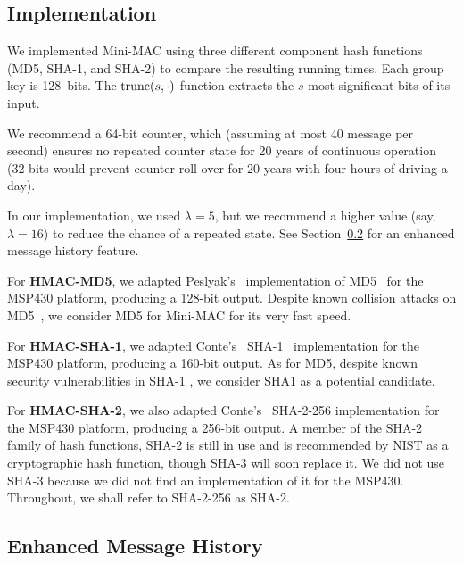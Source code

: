 \subsection{Implementation}
\label{implementation}

We implemented Mini-MAC using three different component hash functions (MD5, SHA-1, and SHA-2) to compare the resulting running times.  
Each group key is 128~bits.  The $\hbox{trunc}(s,\cdot)$ function extracts 
the $s$ most significant bits of its input.

We recommend a 64-bit counter, which (assuming at most 40 message per second) ensures no repeated counter state for 20 years
of continuous operation (32 bits would prevent counter roll-over for 20 years with four hours of driving a day).

In our implementation, we used $\lambda = 5$, 
but we recommend a higher value (say, $\lambda = 16$) to reduce the chance of a repeated state.
See Section~\ref{history} for an enhanced message history feature.

For \textbf{HMAC-MD5},
we adapted Peslyak's~\cite{Peslyak} implementation of MD5~\cite{MD5} for the MSP430 platform, producing a 128-bit output. 
Despite known collision attacks on MD5~\cite{Wang-MD5}, we consider
MD5 for Mini-MAC for its very fast speed.  

For \textbf{HMAC-SHA-1},
we adapted Conte's~\cite{Conte-SHA1} SHA-1~\cite{FIPS-180-4} implementation for the MSP430 platform, producing a 160-bit output. 
As for MD5, despite known security vulnerabilities in SHA-1 \cite{Wang-SHA1}, 
we consider SHA1 as a potential candidate.


For \textbf{HMAC-SHA-2},
we also adapted Conte's~\cite{Conte-SHA256} SHA-2-256 implementation for the MSP430 platform, producing a 256-bit output. 
A member of the SHA-2 family of hash functions, SHA-2 is still in use and is recommended by NIST as a cryptographic hash function, 
though SHA-3 will soon replace it\cite{FIPS-180-4}. We did not use SHA-3 because we did not find an implementation of it
for the MSP430.  Throughout, we shall refer to SHA-2-256 as SHA-2.


\subsection{Enhanced Message History}
\label{history}

